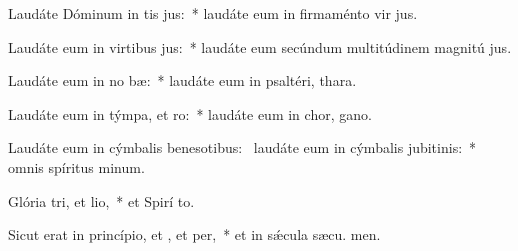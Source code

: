 \item Laudáte Dóminum in tis jus:~* laudáte eum in firmaménto vir jus.
\item Laudáte eum in virtibus jus:~* laudáte eum secúndum multitúdinem magnitú jus.
\item Laudáte eum in no bæ:~* laudáte eum in psaltéri,  thara.
\item Laudáte eum in týmpa, et ro:~* laudáte eum in chor,  gano.
\item Laudáte eum in cýmbalis benesotibus:~\pscross{} laudáte eum in cýmbalis jubitinis:~* omnis spíritus  minum.
\item Glória tri, et lio,~* et Spirí to.
\item Sicut erat in princípio, et , et per,~* et in sǽcula sæcu. men.
